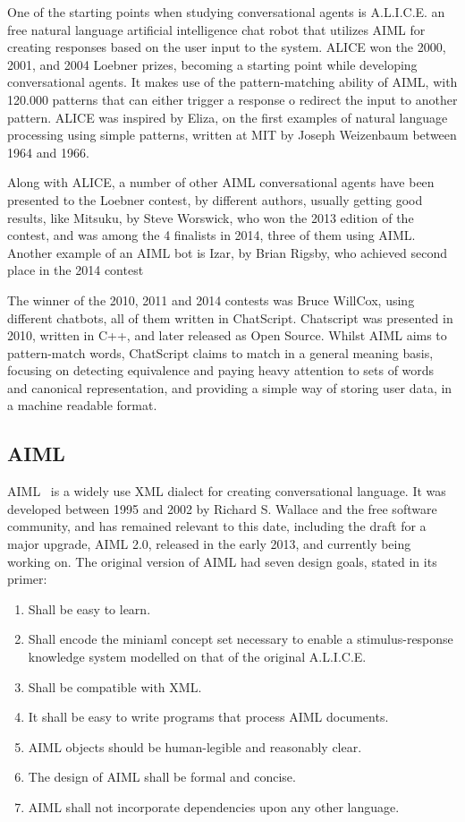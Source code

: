 One of the starting points when studying conversational agents is A.L.I.C.E. an free natural language artificial intelligence chat robot that utilizes AIML for creating responses based on the user input to the system. ALICE won the 2000, 2001, and 2004 Loebner prizes, becoming a starting point while developing conversational agents. It makes use of the pattern-matching ability of AIML, with 120.000 patterns that can either trigger a response o redirect the input to another pattern. ALICE was inspired by Eliza, on the first examples of natural language processing using simple patterns, written at MIT by Joseph Weizenbaum between 1964 and 1966.

Along with ALICE, a number of other AIML conversational agents have been presented to the Loebner contest, by different authors, usually getting good results, like Mitsuku, by Steve Worswick, who won the 2013 edition of the contest, and was among the 4 finalists in 2014, three of them using AIML. Another example of an AIML bot is Izar, by Brian Rigsby, who achieved second place in the 2014 contest

The winner of the 2010, 2011 and 2014 contests was Bruce WillCox, using different chatbots, all of them written in ChatScript. Chatscript was presented in 2010, written in C++, and later released as Open Source. Whilst AIML aims to pattern-match words, ChatScript claims to match in a general meaning basis, focusing on detecting equivalence and paying heavy attention to sets of words and canonical representation, and providing a simple way of storing user data, in a machine readable format.

\subsection{\ac{AIML}}

\ac{AIML}~\cite{aimlprimer} is a widely use XML dialect for creating conversational language. It was developed between 1995 and 2002 by Richard S. Wallace and the free software community, and has remained relevant to this date, including the draft for a major upgrade, AIML 2.0, released in the early 2013, and currently being working on. The original version of AIML had seven design goals, stated in its primer:
\begin{enumerate}[topsep=0pt,itemsep=-1ex,partopsep=1ex,parsep=1ex]
  \item Shall be easy to learn.
  \item Shall encode the miniaml concept set necessary to enable a stimulus-response knowledge system modelled on that of the original A.L.I.C.E.
  \item Shall be compatible with XML.
  \item It shall be easy to write programs that process AIML documents.
  \item \ac{AIML} objects should be human-legible and reasonably clear.
  \item The design of \ac{AIML} shall be formal and concise.
  \item \ac{AIML} shall not incorporate dependencies upon any other language.
\end{enumerate}

